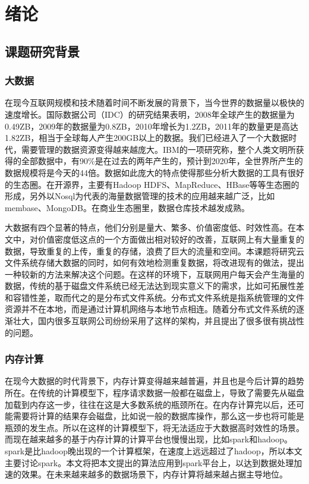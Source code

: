 
\chapter{绪论}
\label{chap:intro}

\section{课题研究背景}
\label{sec:backgroud}

\subsection{大数据}
在现今互联网规模和技术随着时间不断发展的背景下，当今世界的数据量以极快的速度增长。国际数据公司（IDC）的研究结果表明，2008年全球产生的数据量为0.49ZB，2009年的数据量为0.8ZB，2010年增长为1.2ZB，2011年的数量更是高达1.82ZB，相当于全球每人产生200GB以上的数据。我们已经进入了一个大数据时代，需要管理的数据资源变得越来越庞大。IBM的一项研究称，整个人类文明所获得的全部数据中，有90\%是在过去的两年产生的，预计到2020年，全世界所产生的数据规模将是今天的44倍。数据如此庞大的特点使得那些分析大数据的工具有很好的生态圈。在开源界，主要有Hadoop HDFS、MapReduce、HBase等等生态圈的形成，另外以Nosql为代表的海量数据管理的技术的应用越来越广泛，比如membase、MongoDB。在商业生态圈里，数据仓库技术越发成熟。

大数据有四个显著的特点，他们分别是量大、繁多、价值密度低、时效性高。在本文中，对价值密度低这点的一个方面做出相对较好的改善，互联网上有大量重复的数据，导致重复的上传，重复的存储，浪费了巨大的流量和空间。本课题将研究云文件系统存储大数据的同时，如何有效地检测重复数据，将改进现有的做法，提出一种较新的方法来解决这个问题。在这样的环境下，互联网用户每天会产生海量的数据，传统的基于磁盘文件系统已经无法达到现实意义下的需求，比如可拓展性差和容错性差，取而代之的是分布式文件系统。分布式文件系统是指系统管理的文件资源并不在本地，而是通过计算机网络与本地节点相连。随着分布式文件系统的逐渐壮大，国内很多互联网公司纷纷采用了这样的架构，并且提出了很多很有挑战性的问题。

\subsection{内存计算}
在现今大数据的时代背景下，内存计算变得越来越普遍，并且也是今后计算的趋势所在。在传统的计算模型下，程序请求数据一般都在磁盘上，导致了需要先从磁盘加载到内存这一步，往往在这是大多数系统的瓶颈所在。在内存计算完以后，还可能需要将计算的结果存会磁盘，比如说一般的数据库操作，那么这一步也将可能是瓶颈的发生点。所以在这样的计算模型下，将无法适应于大数据高时效性的场景。而现在越来越多的基于内存计算的计算平台也慢慢出现，比如spark和hadoop。spark是比hadoop晚出现的一个计算框架，在速度上远远超过了hadoop，所以本文主要讨论spark。本文将把本文提出的算法应用到spark平台上，以达到数据处理加速的效果。在未来越来越多的数据场景下，内存计算将越来越占据主导地位。

